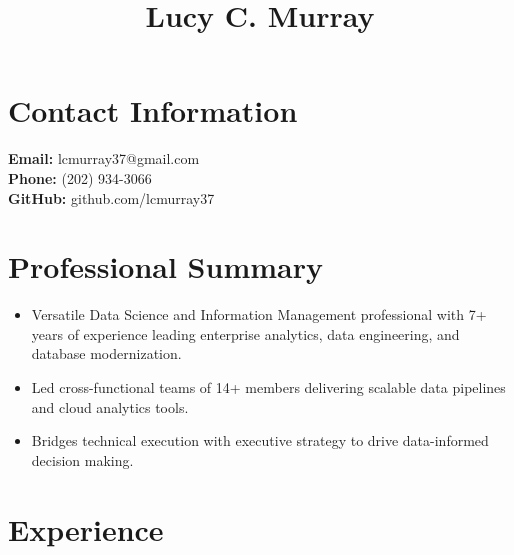 \documentclass{article}%
\title{Lucy C. Murray}%
\date{}%
\begin{document}
%
\normalsize%
\maketitle%
\section{Contact Information}%
\label{sec:ContactInformation}%
\textbf{Email: } lcmurray37@gmail.com\\%
\textbf{Phone: } (202) 934-3066\\%
\textbf{GitHub: } github.com/lcmurray37\\

%
\section{Professional Summary}%
\label{sec:ProfessionalSummary}%
\begin{itemize}%
\item Versatile Data Science and Information Management professional with 7+ years of experience leading enterprise analytics, data engineering, and database modernization.%
\item Led cross-functional teams of 14+ members delivering scalable data pipelines and cloud analytics tools.%
\item Bridges technical execution with executive strategy to drive data-informed decision making.%
\end{itemize}

%
\section{Experience}%
\label{sec:Experience}%
\end{document}
